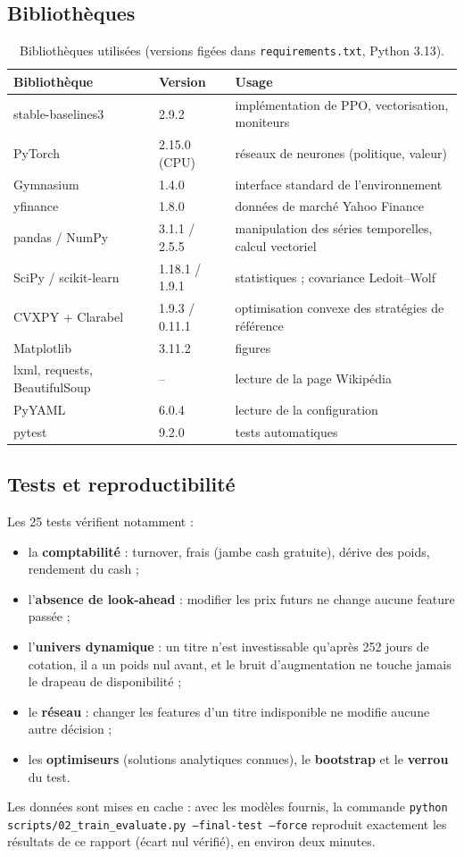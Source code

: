 \documentclass[11pt,a4paper]{article}
\begin{document}
\subsection{Bibliothèques}

\begin{table}[H]
\centering\small
\caption{Bibliothèques utilisées (versions figées dans \texttt{requirements.txt}, Python 3.13).}
\begin{tabularx}{\linewidth}{@{}llY@{}}
\toprule
Bibliothèque & Version & Usage\\
\midrule
stable-baselines3 \cite{sb3} & 2.9.2 & implémentation de PPO, vectorisation, moniteurs\\
PyTorch & 2.15.0 (CPU) & réseaux de neurones (politique, valeur)\\
Gymnasium \cite{gymnasium} & 1.4.0 & interface standard de l'environnement\\
yfinance & 1.8.0 & données de marché Yahoo Finance\\
pandas / NumPy & 3.1.1 / 2.5.5 & manipulation des séries temporelles, calcul vectoriel\\
SciPy / scikit-learn & 1.18.1 / 1.9.1 & statistiques ; covariance Ledoit--Wolf\\
CVXPY \cite{cvxpy} + Clarabel & 1.9.3 / 0.11.1 & optimisation convexe des stratégies de référence\\
Matplotlib & 3.11.2 & figures\\
lxml, requests, BeautifulSoup & -- & lecture de la page Wikipédia\\
PyYAML & 6.0.4 & lecture de la configuration\\
pytest & 9.2.0 & tests automatiques\\
\bottomrule
\end{tabularx}
\end{table}

\subsection{Tests et reproductibilité}
Les 25 tests vérifient notamment :
\begin{itemize}
  \item la \textbf{comptabilité} : turnover, frais (jambe cash gratuite), dérive des poids, rendement du cash ;
  \item l'\textbf{absence de look-ahead} : modifier les prix futurs ne change aucune feature passée ;
  \item l'\textbf{univers dynamique} : un titre n'est investissable qu'après 252 jours de cotation, il a un poids
        nul avant, et le bruit d'augmentation ne touche jamais le drapeau de disponibilité ;
  \item le \textbf{réseau} : changer les features d'un titre indisponible ne modifie aucune autre décision ;
  \item les \textbf{optimiseurs} (solutions analytiques connues), le \textbf{bootstrap} et le \textbf{verrou} du test.
\end{itemize}
Les données sont mises en cache : avec les modèles fournis, la commande
\texttt{python scripts/02\_train\_evaluate.py --final-test --force} reproduit exactement les résultats de ce
rapport (écart nul vérifié), en environ deux minutes.
\end{document}
